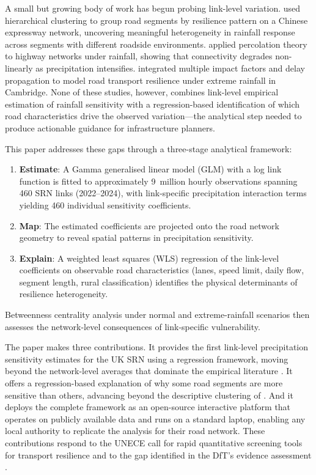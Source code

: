 \documentclass[review]{elsarticle}
\begin{document}
A small but growing body of work has begun probing link-level variation. \citet{gao2024resilience} used hierarchical clustering to group road segments by resilience pattern on a Chinese expressway network, uncovering meaningful heterogeneity in rainfall response across segments with different roadside environments. \citet{li2024percolation} applied percolation theory to highway networks under rainfall, showing that connectivity degrades non-linearly as precipitation intensifies. \citet{liu2026extreme} integrated multiple impact factors and delay propagation to model road transport resilience under extreme rainfall in Cambridge. None of these studies, however, combines link-level empirical estimation of rainfall sensitivity with a regression-based identification of which road characteristics drive the observed variation---the analytical step needed to produce actionable guidance for infrastructure planners.

This paper addresses these gaps through a three-stage analytical framework:

\begin{enumerate}
    \item \textbf{Estimate}: A Gamma generalised linear model (GLM) with a log link function is fitted to approximately 9~million hourly observations spanning 460 SRN links (2022--2024), with link-specific precipitation interaction terms yielding 460 individual sensitivity coefficients.
    \item \textbf{Map}: The estimated coefficients are projected onto the road network geometry to reveal spatial patterns in precipitation sensitivity.
    \item \textbf{Explain}: A weighted least squares (WLS) regression of the link-level coefficients on observable road characteristics (lanes, speed limit, daily flow, segment length, rural classification) identifies the physical determinants of resilience heterogeneity.
\end{enumerate}

\noindent Betweenness centrality analysis under normal and extreme-rainfall scenarios then assesses the network-level consequences of link-specific vulnerability.

The paper makes three contributions. It provides the first link-level precipitation sensitivity estimates for the UK SRN using a regression framework, moving beyond the network-level averages that dominate the empirical literature \citep{hranac2006empirical,koetse2009impact}. It offers a regression-based explanation of why some road segments are more sensitive than others, advancing beyond the descriptive clustering of \citet{gao2024resilience}. And it deploys the complete framework as an open-source interactive platform that operates on publicly available data and runs on a standard laptop, enabling any local authority to replicate the analysis for their road network. These contributions respond to the UNECE call for rapid quantitative screening tools for transport resilience \citep{unece2024stress} and to the gap identified in the DfT's evidence assessment \citep{dft2024rea}.
\end{document}
